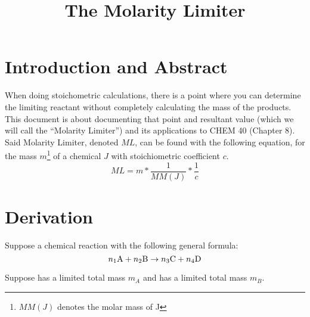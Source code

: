 \documentclass[11pt]{article}
\begin{document}
\title{The Molarity Limiter}
\author{}
\date{}
\maketitle

\section{Introduction and Abstract}
When doing stoichometric calculations, there is a point where you can determine the limiting reactant without completely calculating the mass of the products.
This document is about documenting that point and resultant value (which we will call the ``Molarity Limiter'') and its applications to CHEM 40 (Chapter 8).
Said Molarity Limiter, denoted $ML$, can be found with the following equation, for the mass $m$\footnote{$MM(J)$ denotes the molar mass of J} of a chemical $J$ with stoichiometric coefficient $c$.
\begin{equation}
    ML = m * \frac{1}{MM(J)}* \frac{1}{c}
\end{equation}

\section{Derivation}
Suppose a chemical reaction with the following general formula:
\begin{equation}
    n_1\ce{A} + n_2\ce{B} \to n_3\ce{C} + n_4\ce{D}
\end{equation}

Suppose  has a limited total mass $m_A$ and  has a limited total mass $m_B$. 
\end{document}
